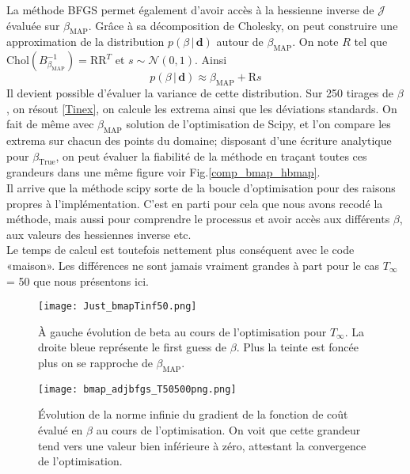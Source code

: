 \documentclass[a4paper,12pt]{article}
\newcommand{\bepar}[1]{
	\left( #1 \right)  
}
\newcommand{\bmap}{\beta_{\text{MAP}}}
\newcommand{\J}{\mathcal{J}}
\newcommand{\tinf}{$T_\infty$}
\numberwithin{equation}{section} %
\begin{document}
\noindent La méthode BFGS permet également d'avoir accès à la hessienne inverse de $\J$ évaluée sur $\bmap$. Grâce à sa décomposition de Cholesky, on peut construire une approximation de la distribution $p\bepar{\beta\,|\,\textbf{d}}$ autour de $\bmap$. 
On note $R$ tel que $\text{Chol}\bepar{B_{\bmap}^{-1}} = \text{R}\text{R}^T$ et $s \sim \mathcal{N}\bepar{0,1}$. Ainsi 
\begin{equation}
p\bepar{\beta\,|\,\textbf{d}} \approx \bmap + \text{R}s \label{distribbmap}
\end{equation}
Il devient possible d'évaluer la variance de cette distribution. Sur 250 tirages de $\beta$, on résout \eqref{Tinex}, on calcule les extrema ainsi que les déviations standards. On fait de même avec $\bmap$ solution de l'optimisation de Scipy, et l'on compare les extrema sur chacun des points du domaine; disposant d'une écriture analytique pour $\beta_{\text{True}}$, on peut évaluer la fiabilité de la méthode en traçant toutes ces grandeurs dans une même figure voir Fig.\eqref{comp_bmap_hbmap}. \\
 Il arrive que la méthode scipy sorte de la boucle d'optimisation pour des raisons propres à l'implémentation. C'est en parti pour cela que nous avons recodé la méthode, mais aussi pour comprendre le processus et avoir accès aux différents $\beta$, aux valeurs des hessiennes inverse etc.\\
 Le temps de calcul est toutefois nettement plus conséquent avec le code «maison». Les différences ne sont jamais vraiment grandes à part pour le cas \tinf = 50 que nous présentons ici. 

\begin{figure}[!ht]
\centering
\texttt{[image: Just\_bmapTinf50.png]}
\caption{\small{À gauche évolution de beta au cours de l'optimisation pour $T_\infty$. La droite bleue représente le first guess de $\beta$. Plus la teinte est foncée plus on se rapproche de $\bmap$.}}
\label{tinf50cpt_500}
\end{figure}

\begin{figure}[!ht]
\centering
\texttt{[image: bmap\_adjbfgs\_T50500png.png]}
\caption{\small{Évolution de la norme infinie du gradient de la fonction de coût évalué en $\beta$ au cours de l'optimisation. On voit que cette grandeur tend vers une valeur bien inférieure à zéro, attestant la convergence de l'optimisation.}}
\label{evolT50}
\end{figure}
\end{document}
